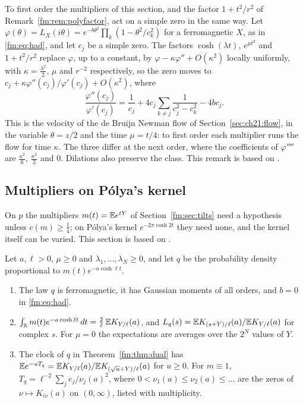 \begin{remark}
\end{remark}


\begin{remark}\label{fm:rem:firstorder}
To first order the multipliers of this section, and the factor $1+t^2/r^2$ of Remark~\ref{fm:rem:polyfactor}, act on a simple zero in the same way. Let $\varphi(\theta)=L_X(i\theta)=e^{-b\theta^2}\prod_k(1-\theta^2/c_k^2)$ for a ferromagnetic $X$, as in \eqref{fm:eq:had}, and let $c_j$ be a simple zero. The factors $\cosh(\lambda t)$, $e^{\mu t^2}$ and $1+t^2/r^2$ replace $\varphi$, up to a constant, by $\varphi-\kappa\varphi''+O(\kappa^2)$ locally uniformly, with $\kappa=\frac{\lambda^2}2$, $\mu$ and $r^{-2}$ respectively, so the zero moves to $c_j+\kappa\varphi''(c_j)/\varphi'(c_j)+O(\kappa^2)$, where
\[
\frac{\varphi''(c_j)}{\varphi'(c_j)}=\frac1{c_j}+4c_j\sum_{k\ne j}\frac1{c_j^2-c_k^2}-4bc_j .
\]
This is the velocity of the de Bruijn Newman flow of Section~\ref{sec:ch21:flow}, in the variable $\theta=z/2$ and the time $\mu=t/4$: to first order each multiplier runs the flow for time $\kappa$. The three differ at the next order, where the coefficients of $\varphi''''$ are $\frac{\kappa^2}6$, $\frac{\kappa^2}2$ and $0$. Dilations also preserve the class. This remark is based on \cite{P26gumbelop}.
\end{remark}

\subsection{Multipliers on P\'olya's kernel}\label{fm:sec:bessel}

On $p$ the multipliers $m(t)=\mathbb{E} e^{tY}$ of Section~\ref{fm:sec:tilts} need a hypothesis unless $c(m)\ge\frac14$; on P\'olya's kernel $e^{-2\pi\cosh2t}$ they need none, and the kernel itself can be varied. This section is based on \cite{P26wferro,P26gumbel,P26gumbelop,P26bspin}.

\begin{theorem}\label{fm:thm:bessel}
Let $a,\ell>0$, $\mu\ge0$ and $\lambda_1,\dots,\lambda_N\ge0$, and let $q$ be the probability density proportional to $m(t)e^{-a\cosh\ell t}$.
\begin{enumerate}
\item[(i)] The law $q$ is ferromagnetic, it has Gaussian moments of all orders, and $b=0$ in \eqref{fm:eq:had}.
\item[(ii)] $\int_{\mathbb{R}}m(t)e^{-a\cosh\ell t}\,dt=\frac2\ell\,\mathbb{E} K_{Y/\ell}(a)$, and $L_q(s)=\mathbb{E} K_{(s+Y)/\ell}(a)/\mathbb{E} K_{Y/\ell}(a)$ for complex $s$. For $\mu=0$ the expectations are averages over the $2^N$ values of $Y$.
\item[(iii)] The clock of $q$ in Theorem~\ref{fm:thm:dual} has $\mathbb{E} e^{-uT_q}=\mathbb{E} K_{Y/\ell}(a)/\mathbb{E} K_{(\sqrt u+Y)/\ell}(a)$ for $u\ge0$. For $m\equiv1$, $T_q=\ell^{-2}\sum_je_j/\nu_j(a)^2$, where $0<\nu_1(a)\le\nu_2(a)\le\dots$ are the zeros of $\nu\mapsto K_{i\nu}(a)$ on $(0,\infty)$, listed with multiplicity.
\end{enumerate}
\end{theorem}

